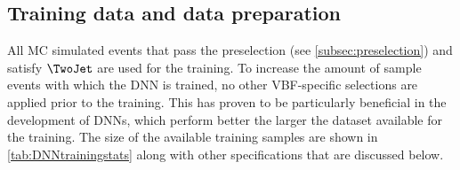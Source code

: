 

\subsection{Training data and data preparation}
\label{subsec:training-data}
All MC simulated events that pass the preselection (see \cref{subsec:preselection}) and satisfy $\TwoJet$ are used for the training. To increase the amount of sample events with which the DNN is trained, no other VBF-specific selections are applied prior to the training. This has proven to be particularly beneficial in the development of DNNs, which perform better the larger the dataset available for the training.
The size of the available training samples are shown in \cref{tab:DNNtrainingstats} along with other specifications that are discussed below.
